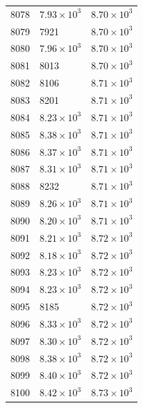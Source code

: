 \begin{table}[H]
\begin{tabular}{lll}
8078 & $\displaystyle 7.93 \times 10^{3}$ & $\displaystyle 8.70 \times 10^{3}$ \\
8079 & 7921 & $\displaystyle 8.70 \times 10^{3}$ \\
8080 & $\displaystyle 7.96 \times 10^{3}$ & $\displaystyle 8.70 \times 10^{3}$ \\
8081 & 8013 & $\displaystyle 8.70 \times 10^{3}$ \\
8082 & 8106 & $\displaystyle 8.71 \times 10^{3}$ \\
8083 & 8201 & $\displaystyle 8.71 \times 10^{3}$ \\
8084 & $\displaystyle 8.23 \times 10^{3}$ & $\displaystyle 8.71 \times 10^{3}$ \\
8085 & $\displaystyle 8.38 \times 10^{3}$ & $\displaystyle 8.71 \times 10^{3}$ \\
8086 & $\displaystyle 8.37 \times 10^{3}$ & $\displaystyle 8.71 \times 10^{3}$ \\
8087 & $\displaystyle 8.31 \times 10^{3}$ & $\displaystyle 8.71 \times 10^{3}$ \\
8088 & 8232 & $\displaystyle 8.71 \times 10^{3}$ \\
8089 & $\displaystyle 8.26 \times 10^{3}$ & $\displaystyle 8.71 \times 10^{3}$ \\
8090 & $\displaystyle 8.20 \times 10^{3}$ & $\displaystyle 8.71 \times 10^{3}$ \\
8091 & $\displaystyle 8.21 \times 10^{3}$ & $\displaystyle 8.72 \times 10^{3}$ \\
8092 & $\displaystyle 8.18 \times 10^{3}$ & $\displaystyle 8.72 \times 10^{3}$ \\
8093 & $\displaystyle 8.23 \times 10^{3}$ & $\displaystyle 8.72 \times 10^{3}$ \\
8094 & $\displaystyle 8.23 \times 10^{3}$ & $\displaystyle 8.72 \times 10^{3}$ \\
8095 & 8185 & $\displaystyle 8.72 \times 10^{3}$ \\
8096 & $\displaystyle 8.33 \times 10^{3}$ & $\displaystyle 8.72 \times 10^{3}$ \\
8097 & $\displaystyle 8.30 \times 10^{3}$ & $\displaystyle 8.72 \times 10^{3}$ \\
8098 & $\displaystyle 8.38 \times 10^{3}$ & $\displaystyle 8.72 \times 10^{3}$ \\
8099 & $\displaystyle 8.40 \times 10^{3}$ & $\displaystyle 8.72 \times 10^{3}$ \\
8100 & $\displaystyle 8.42 \times 10^{3}$ & $\displaystyle 8.73 \times 10^{3}$ \\

\end{tabular}
\end{table}
